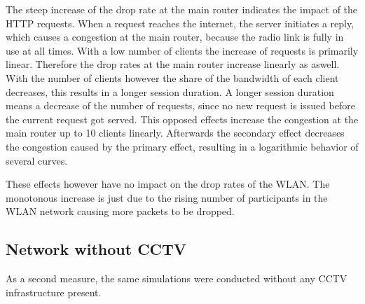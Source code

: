 \documentclass[
10pt, %
a4paper, %
oneside, %
headinclude,footinclude, %
BCOR5mm, %
]{scrartcl}
\begin{document}
The steep increase of the drop rate at the main router indicates the impact of the HTTP requests. When a request reaches the internet, the server initiates a reply, which causes a congestion at the main router, because the radio link is fully in use at all times. With a low number of clients the increase of requests is primarily linear. Therefore the drop rates at the main router increase linearly as aswell. With the number of clients however the share of the bandwidth of each client decreases, this results in a longer session duration. A longer session duration means a decrease of the number of requests, since no new request is issued before the current request got served. This opposed effects increase the congestion at the main router up to 10 clients linearly. Afterwards the secondary effect decreases the congestion caused by the primary effect, resulting in a logarithmic behavior of several curves. 

These effects however have no impact on the drop rates of the WLAN. The monotonous increase is just due to the rising number of participants in the WLAN network causing more packets to be dropped.

\subsection{Network without CCTV}
As a second measure, the same simulations were conducted without any CCTV infrastructure present.
\end{document}
